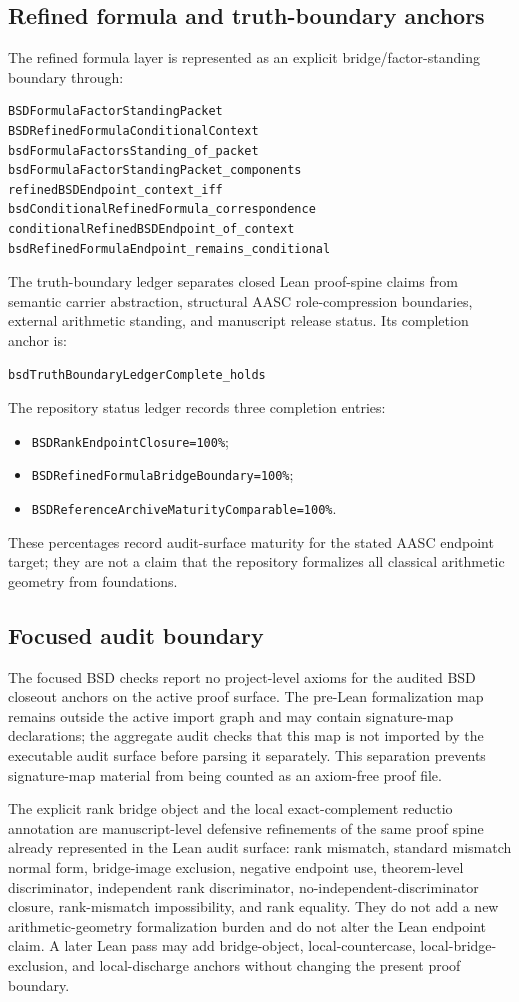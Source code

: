 \documentclass[11pt]{article}
\begin{document}
\subsection{Refined formula and truth-boundary anchors}
The refined formula layer is represented as an explicit bridge/factor-standing boundary through:
\begin{verbatim}
BSDFormulaFactorStandingPacket
BSDRefinedFormulaConditionalContext
bsdFormulaFactorsStanding_of_packet
bsdFormulaFactorStandingPacket_components
refinedBSDEndpoint_context_iff
bsdConditionalRefinedFormula_correspondence
conditionalRefinedBSDEndpoint_of_context
bsdRefinedFormulaEndpoint_remains_conditional
\end{verbatim}
The truth-boundary ledger separates closed Lean proof-spine claims from semantic carrier abstraction, structural AASC role-compression boundaries, external arithmetic standing, and manuscript release status. Its completion anchor is:
\begin{verbatim}
bsdTruthBoundaryLedgerComplete_holds
\end{verbatim}
The repository status ledger records three completion entries:
\begin{itemize}
\item \texttt{BSDRankEndpointClosure=100\%};
\item \texttt{BSDRefinedFormulaBridgeBoundary=100\%};
\item \texttt{BSDReferenceArchiveMaturityComparable=100\%}.
\end{itemize}
These percentages record audit-surface maturity for the stated AASC endpoint target; they are not a claim that the repository formalizes all classical arithmetic geometry from foundations.

\subsection{Focused audit boundary}
The focused BSD checks report no project-level axioms for the audited BSD closeout anchors on the active proof surface. The pre-Lean formalization map remains outside the active import graph and may contain signature-map declarations; the aggregate audit checks that this map is not imported by the executable audit surface before parsing it separately. This separation prevents signature-map material from being counted as an axiom-free proof file.

The explicit rank bridge object and the local exact-complement reductio annotation are manuscript-level defensive refinements of the same proof spine already represented in the Lean audit surface: rank mismatch, standard mismatch normal form, bridge-image exclusion, negative endpoint use, theorem-level discriminator, independent rank discriminator, no-independent-discriminator closure, rank-mismatch impossibility, and rank equality. They do not add a new arithmetic-geometry formalization burden and do not alter the Lean endpoint claim. A later Lean pass may add bridge-object, local-countercase, local-bridge-exclusion, and local-discharge anchors without changing the present proof boundary.
\end{document}
